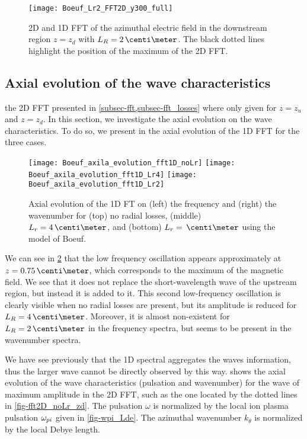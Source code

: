 \begin{figure}[hbtp]
  \centering
  \texttt{[image: Boeuf\_Lr2\_FFT2D\_y300\_full]}
  \caption{\ac{2D} and \ac{1D} \ac{FFT} of the azimuthal electric field in the downstream region $z=z_d$ with $L_R=2\,\centi\meter$.  The black dotted lines highlight the position of the maximum of the \ac{2D} \ac{FFT}.}
  \label{fig-fft2D_Lr2_zd}
\end{figure}

\subsection{Axial evolution of the wave characteristics} \label{subsec-axial_profile}

the \ac{2D} \ac{FFT} presented in \cref{subsec-fft,subsec-fft_losses} where only given for $z=z_u$ and $z=z_d$.
In this section, we investigate the axial evolution on the wave characteristics.
To do so, we present in  the axial evolution of the \ac{1D} \ac{FFT} for the three cases.
 
\begin{figure}[hbtp]
  \centering
  \texttt{[image: Boeuf\_axila\_evolution\_fft1D\_noLr]}
  \texttt{[image: Boeuf\_axila\_evolution\_fft1D\_Lr4]}
  \texttt{[image: Boeuf\_axila\_evolution\_fft1D\_Lr2]}
  \caption{Axial evolution of the \ac{1D} \ac{FT} on (left) the frequency and (right) the wavenumber for (top) no radial losses, (middle) $L_r=4\,\centi\meter$, and (bottom) $L_r=\,\centi\meter$ using the model of Boeuf. }
  \label{fig-axial_fft1D}
\end{figure}

We can see in \cref{fig-axial_fft1D} that the low frequency oscillation appears approximately at $z=0.75\,\centi\meter$, which corresponds to the maximum of the magnetic field.
We see that it does not replace the short-wavelength wave of the upstream region, but instead it is added to it.
This second low-frequency oscillation is clearly visible when no radial losses are present, but its amplitude is reduced for $L_R=4\,\centi\meter$.
Moreover, it is almost non-existent for $L_R=2\,\centi\meter$ in the frequency spectra, but seems to be present in the wavenumber spectra.

We have see previously that the \ac{1D} spectral aggregates the waves information, thus the larger wave cannot be directly observed by this way.
 shows the axial evolution of the wave characteristics (pulsation and wavenumber) for the wave of maximum amplitude in the \ac{2D} \ac{FFT}, such as the one located by the dotted lines in \cref{fig-fft2D_noLr_zd}.
The pulsation $\omega$ is normalized by the local ion plasma pulsation $\omega_{pi}$ given in \cref{fig-wpi_Lde}.
The azimuthal wavenumber $k_{\theta}$ is normalized by the local Debye length.
 

